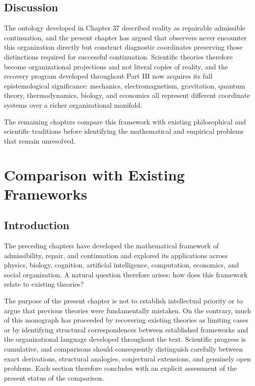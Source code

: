 \documentclass[11pt,oneside]{book}
\numberwithin{equation}{chapter}
\theoremstyle{definition}
\theoremstyle{plain}
\begin{document}
\section{Discussion}

The ontology developed in Chapter 37 described reality as repairable admissible continuation, and the present chapter has argued that observers never encounter this organization directly but construct diagnostic coordinates preserving those distinctions required for successful continuation. Scientific theories therefore become organizational projections and not literal copies of reality, and the recovery program developed throughout Part III now acquires its full epistemological significance: mechanics, electromagnetism, gravitation, quantum theory, thermodynamics, biology, and economics all represent different coordinate systems over a richer organizational manifold.

The remaining chapters compare this framework with existing philosophical and scientific traditions before identifying the mathematical and empirical problems that remain unresolved.

\chapter{Comparison with Existing Frameworks}

\section{Introduction}

The preceding chapters have developed the mathematical framework of admissibility, repair, and continuation and explored its applications across physics, biology, cognition, artificial intelligence, computation, economics, and social organization. A natural question therefore arises: how does this framework relate to existing theories?

The purpose of the present chapter is not to establish intellectual priority or to argue that previous theories were fundamentally mistaken. On the contrary, much of this monograph has proceeded by recovering existing theories as limiting cases or by identifying structural correspondences between established frameworks and the organizational language developed throughout the text. Scientific progress is cumulative, and comparisons should consequently distinguish carefully between exact derivations, structural analogies, conjectural extensions, and genuinely open problems. Each section therefore concludes with an explicit assessment of the present status of the comparison.
\end{document}
